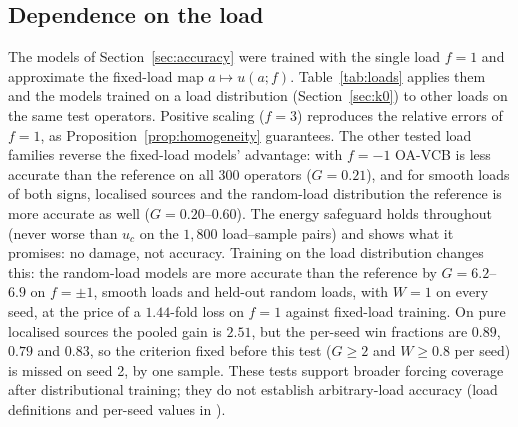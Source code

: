\subsection{Dependence on the load}\label{sec:rhs}

The models of Section~\ref{sec:accuracy} were trained with the single load $f=1$ and approximate the fixed-load map
$a\mapsto u(a;f)$. Table~\ref{tab:loads} applies them and the models trained on a load distribution (Section~\ref{sec:k0}) to
other loads on the same test operators. Positive scaling ($f=3$) reproduces the relative errors of $f=1$, as
Proposition~\ref{prop:homogeneity} guarantees. The other tested load families reverse the fixed-load models' advantage: with
$f=-1$ OA-VCB is less accurate than the reference on all 300 operators ($G = 0.21$), and for smooth loads of both signs,
localised sources and the random-load distribution the reference is more accurate as well ($G = 0.20$--$0.60$). The energy
safeguard holds throughout (never worse than $u_c$ on the $1{,}800$ load--sample pairs) and shows what it promises: no damage,
not accuracy. Training on the load distribution changes this: the random-load models are more accurate than the reference by
$G = 6.2$--$6.9$ on $f=\pm1$, smooth loads and held-out random loads, with $W = 1$ on every seed, at the price of a $1.44$-fold
loss on $f=1$ against fixed-load training. On pure localised sources the pooled gain is $2.51$, but the per-seed win fractions
are $0.89$, $0.79$ and $0.83$, so the criterion fixed before this test ($G\ge2$ and $W\ge0.8$ per seed) is missed on seed 2, by one
sample. These tests support broader forcing coverage after distributional training; they do not establish arbitrary-load
accuracy (load definitions and per-seed values in ).

